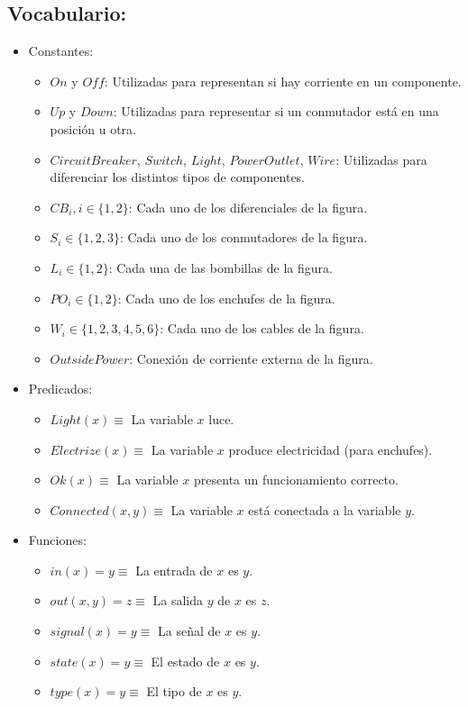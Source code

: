\documentclass[10pt, a4paper,spanish]{article}
\begin{document}
		\subsection{Vocabulario:}
			\begin{itemize}
				\item Constantes:
				\begin{itemize}
					\item $On$ y $Off$: Utilizadas para  representan si hay corriente en un componente.
					\item $Up$ y $Down$: Utilizadas para representar si un conmutador está en una posición u otra.
					\item $CircuitBreaker$, $Switch$, $Light$, $PowerOutlet$, $Wire$: Utilizadas para diferenciar los distintos tipos de componentes.
					\item $CB_i, i \in \{1,2\}$: Cada uno de los diferenciales de la figura.
					\item $S_i \in \{1,2,3\}$:  Cada uno de los conmutadores de la figura.
					\item $L_i \in \{1,2\}$: Cada una de las bombillas de la figura.
					\item $PO_i \in \{1,2\}$: Cada uno de los enchufes de la figura.
					\item $W_i \in \{1,2,3,4,5,6\}$: Cada uno de los cables de la figura.
					\item $OutsidePower$: Conexión de corriente externa de la figura.
				\end{itemize}
				\item Predicados:
				\begin{itemize}
					\item $Light(x) \equiv$ La variable $x$ luce.
					\item $Electrize(x) \equiv$ La variable $x$ produce electricidad (para enchufes).
					\item $Ok(x) \equiv$ La variable $x$ presenta un funcionamiento correcto.
					\item $Connected(x, y) \equiv$ La variable $x$ está conectada a la variable $y$.
				\end{itemize}
				\item Funciones:
				\begin{itemize}
					\item $in(x) = y \equiv$ La entrada de $x$ es $y$.
					\item $out(x,y) = z \equiv$ La salida $y$ de $x$ es  $z$.
					\item $signal(x) = y \equiv$ La señal de $x$ es  $y $.
					\item $state(x) = y \equiv$ El estado de $x$ es $y$.
					\item $type(x) = y \equiv$ El tipo de $x$ es $y$.
				\end{itemize}
			\end{itemize}
\end{document}
